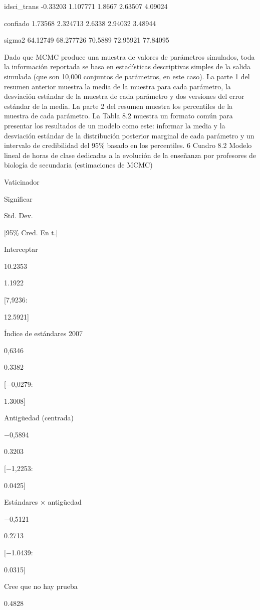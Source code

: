 \documentclass[
]{book}
\begin{document}
idsci\_trans -0.33203 1.107771 1.8667 2.63507 4.09024

confiado 1.73568 2.324713 2.6338 2.94032 3.48944

sigma2 64.12749 68.277726 70.5889 72.95921 77.84095

Dado que MCMC produce una muestra de valores de parámetros simulados, toda la información reportada se basa en estadísticas descriptivas simples de la salida simulada (que son 10,000 conjuntos de parámetros, en este caso). La parte 1 del resumen anterior muestra la media de la muestra para cada parámetro, la desviación estándar de la muestra de cada parámetro y dos versiones del error estándar de la media. La parte 2 del resumen muestra los percentiles de la muestra de cada parámetro. La Tabla 8.2 muestra un formato común para presentar los resultados de un modelo como este: informar la media y la desviación estándar de la distribución posterior marginal de cada parámetro y un intervalo de credibilidad del 95\% basado en los percentiles. 6
Cuadro 8.2
Modelo lineal de horas de clase dedicadas a la evolución de la enseñanza por profesores de biología de secundaria (estimaciones de MCMC)

Vaticinador

Significar

Std. Dev.

{[}95\% Cred. En t.{]}

Interceptar

10.2353

1.1922

{[}7,9236:

12.5921{]}

Índice de estándares 2007

0,6346

0.3382

{[}−0,0279:

1.3008{]}

Antigüedad (centrada)

−0,5894

0.3203

{[}−1,2253:

0.0425{]}

Estándares × antigüedad

−0,5121

0.2713

{[}−1.0439:

0.0315{]}

Cree que no hay prueba

0.4828
\end{document}
